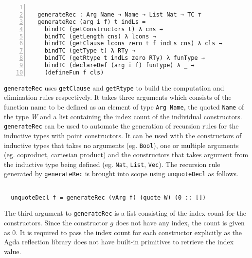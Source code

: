 \documentclass[sigplan,10pt]{acmart}
\begin{document}
\begin{center}
\begingroup
\fontsize{7pt}{9pt}\selectfont
\begin{Verbatim}[frame = lines, rulecolor=\color{blue}, numbers = left, numbersep = 0pt]

  generateRec : Arg Name → Name → List Nat → TC ⊤
  generateRec (arg i f) t indLs =
    bindTC (getConstructors t) λ cns →
    bindTC (getLength cns) λ lcons →
    bindTC (getClause lcons zero t f indLs cns) λ cls →
    bindTC (getType t) λ RTy → 
    bindTC (getRtype t indLs zero RTy) λ funType →
    bindTC (declareDef (arg i f) funType) λ _ →
    (defineFun f cls)

\end{Verbatim}
\endgroup
\end{center}

\normalsize

{\tt generateRec} uses {\tt getClause} and {\tt getRtype} to build the computation and elimination rules respectively. It takes three arguments which consists of the function name to be defined as an element of type {\tt Arg Name}, the quoted {\tt Name} of the type \emph{W} and a list containing the index count of the individual constructors. {\tt generateRec} can be used to automate the generation of recursion rules for the inductive types with point constructors. It can be used with the constructors of inductive types that takes no arguments (eg. {\tt Bool}), one or multiple arguments (eg. coproduct, cartesian product) and the constructors that takes argument from the inductive type being defined (eg. {\tt Nat}, {\tt List}, {\tt Vec}). The recursion rule generated by {\tt generateRec} is brought into scope using {\tt unquoteDecl} as follows.

\begin{center}
\begingroup
\fontsize{8pt}{9pt}\selectfont
\begin{Verbatim}

  unquoteDecl f = generateRec (vArg f) (quote W) (0 :: [])

\end{Verbatim}
\endgroup
\end{center}

\normalsize

The third argument to {\tt generateRec} is a list consisting of the index count for the constructors. Since the constructor $g$ does not have any index, the count is given as 0. It is required to pass the index count for each constructor explicitly as the Agda reflection library does not have built-in primitives to retrieve the index value.
\end{document}
